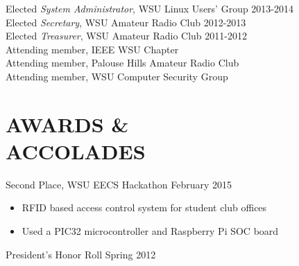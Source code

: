 \documentclass[line, margin]{res}
\begin{document}
\begin{resume}
            Elected {\it System Administrator}, WSU Linux Users' Group \hfill 2013-2014\\
            Elected {\it Secretary}, WSU Amateur Radio Club \hfill 2012-2013\\
            Elected {\it Treasurer}, WSU Amateur Radio Club \hfill 2011-2012\\
            Attending member, IEEE WSU Chapter\\
            Attending member, Palouse Hills Amateur Radio Club\\
            Attending member, WSU Computer Security Group

\section{AWARDS \& \\ ACCOLADES}
            Second Place, WSU EECS Hackathon \hfill February 2015
        \begin{itemize} \itemsep -2pt
                \item RFID based access control system for student club offices
                \item Used a PIC32 microcontroller and Raspberry Pi SOC board
            \end{itemize}
            President's Honor Roll \hfill Spring 2012

\end{resume}
\end{document}
